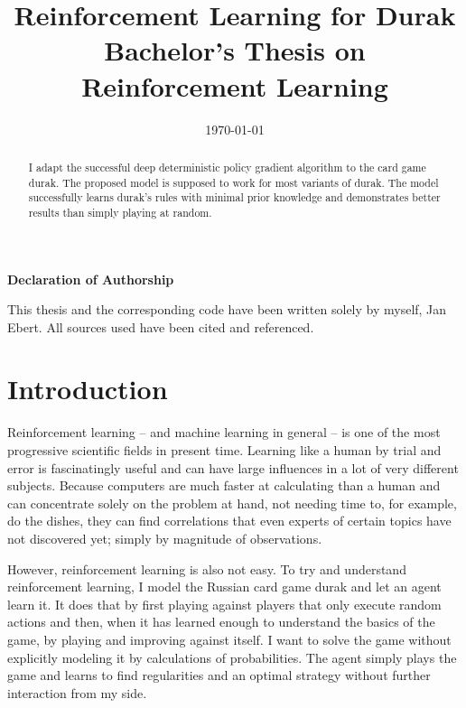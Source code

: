 \documentclass[a4paper,titlepage]{article}
\title{Reinforcement Learning for Durak \\ \medskip \large{Bachelor's Thesis on Reinforcement Learning}}
\date{\today}
\begin{document}
\maketitle

\setcounter{page}{2}
\thispagestyle{empty}
\noindent
\textbf{Declaration of Authorship} \medskip

\noindent
This thesis and the corresponding code have been written solely by myself, Jan Ebert. All sources used have been cited and referenced. \bigskip

\noindent
\makebox[3cm]{\hrulefill} \hspace{0.2cm} \makebox[4cm]{\hrulefill}

\noindent
{} \hspace{0.2cm} 

\begin{abstract}
\setcounter{page}{3}
I adapt the successful deep deterministic policy gradient algorithm to the card game durak. The proposed model is supposed to work for most variants of durak. The model successfully learns durak's rules with minimal prior knowledge %
and demonstrates better results than simply playing at random.
\end{abstract}

\setcounter{page}{4}
\thispagestyle{empty}
\tableofcontents

\newpage


\section{Introduction}

Reinforcement learning -- and machine learning in general -- is one of the most progressive scientific fields in present time. Learning like a human by trial and error is fascinatingly useful and can have large influences in a lot of very different subjects. Because computers are much faster at calculating than a human and can concentrate solely on the problem at hand, not needing time to, for example, do the dishes, they can find correlations that even experts of certain topics have not discovered yet; simply by magnitude of observations.

However, reinforcement learning is also not easy. To try and understand reinforcement learning, I model the Russian card game durak and let an agent learn it. It does that by first playing against players that only execute random actions and then, when it has learned enough to understand the basics of the game, by playing and improving against itself. I want to solve the game without explicitly modeling it by calculations of probabilities. The agent simply plays the game and learns to find regularities and an optimal strategy without further interaction from my side.
\end{document}
